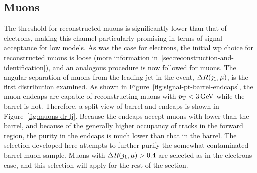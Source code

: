 \clearpage

\subsection{Muons}
\label{sec:muon-selection}

The \pt threshold for reconstructed muons is significantly lower than that of electrons, making this channel particularly promising in terms of signal acceptance for low \dm models. As was the case for electrons, the initial \gls{wp} choice for reconstructed muons is loose (more information in~\ref{sec:reconstruction-and-identification}), and an analogous procedure is now followed for muons. The angular separation of muons from the leading jet in the event, $\Delta R(\jmath_1,\mu)$, is the first distribution examined. As shown in Figure~\ref{fig:signal-pt-barrel-endcaps}, the muon endcaps are capable of reconstructing muons with $p_{\mathrm{T}}<3\,\text{Ge\hspace{-.08em}V}$ while the barrel is not. Therefore, a split view of barrel and endcaps is shown in Figure~\ref{fig:muons-dr-lj}. Because the endcaps accept muons with lower \pt than the barrel, and because of the generally higher occupancy of tracks in the forward region, the purity in the endcaps is much lower than that in the barrel. The selection developed here attempts to further purify the somewhat contaminated barrel muon sample. Muons with $\Delta R(\jmath_1,\mu)>0.4$ are selected as in the electrons case, and this selection will apply for the rest of the section.

